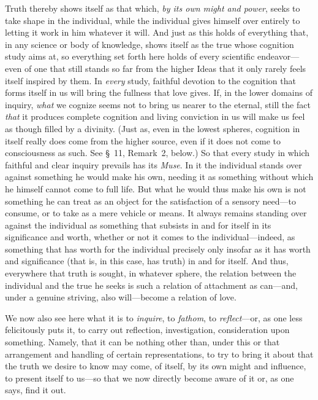 \documentclass[12pt,a4paper]{book}
\begin{document}
Truth thereby shows itself as that which, \emph{by its own might and power},
seeks to take shape in the individual, while the individual gives himself over
entirely to letting it work in him whatever it will. And just as this holds of
everything that, in any science or body of knowledge, shows itself as the true
whose cognition study aims at, so everything set forth here holds of every
scientific endeavor---even of one that still stands so far from the higher Ideas
that it only rarely feels itself inspired by them. In \emph{every} study,
faithful devotion to the cognition that forms itself in us will bring the
fullness that love gives. If, in the lower domains of inquiry, \emph{what} we cognize
seems not to bring us nearer to the eternal, still the fact \emph{that} it produces
complete cognition and living conviction in us will make us feel as though
filled by a divinity. (Just as, even in the lowest spheres, cognition in itself
really does come from the higher source, even if it does not come to
consciousness as such. See \S~11, Remark~2, below.) So that every study in which
faithful and clear inquiry prevails has its \emph{Muse}. In it the individual
stands over against something he would make his own, needing it as something
without which he himself cannot come to full life. But what he would thus make
his own is not something he can treat as an object for the satisfaction of a
sensory need---to consume, or to take as a mere vehicle or means. It always
remains standing over against the individual as something that subsists in and
for itself in its significance and worth, whether or not it comes to the
individual---indeed, as something that has worth for the individual precisely
only insofar as it has worth and significance (that is, in this case, has truth)
in and for itself. And thus, everywhere that truth is sought, in whatever
sphere, the relation between the individual and the true he seeks is such a
relation of attachment as can---and, under a genuine striving, also will---become
a relation of love.

We now also see here what it is to \emph{inquire}, to \emph{fathom}, to
\emph{reflect}---or, as one less felicitously puts it, to carry out reflection,
investigation, consideration upon something. Namely, that it can be nothing
other than, under this or that arrangement and handling of certain
representations, to try to bring it about that the truth we desire to know may
come, of itself, by its own might and influence, to present itself to us---so
that we now directly become aware of it or, as one says, find it out.
\end{document}
